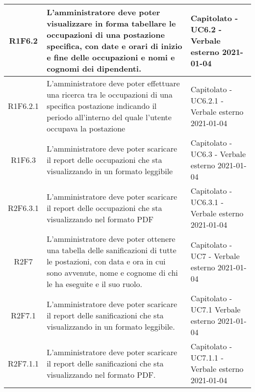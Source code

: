 \begin{center}
\begin{longtable}{|c|p{10cm}|p{4cm}|}
			\hline
			R1F6.2&L'amministratore deve poter visualizzare in forma tabellare le occupazioni di una postazione specifica, con date e orari di inizio e fine delle occupazioni e nomi e cognomi dei dipendenti.	&Capitolato - UC6.2 - Verbale esterno 2021-01-04	\\
			\hline
			R1F6.2.1&L'amministratore deve poter effettuare una ricerca tra le occupazioni di una specifica postazione indicando il periodo all'interno del quale l'utente occupava la postazione	& 	Capitolato - UC6.2.1 - Verbale esterno 2021-01-04\\
			\hline
			R1F6.3 & L'amministratore deve poter scaricare il report delle occupazioni che sta visualizzando in un formato leggibile & Capitolato - UC6.3 - Verbale esterno 2021-01-04\\
			\hline
			R2F6.3.1 & L'amministratore deve poter scaricare il report delle occupazioni che sta visualizzando nel formato PDF & Capitolato - UC6.3.1 - Verbale esterno 2021-01-04\\
			\hline
R2F7&L'amministratore deve poter ottenere una tabella delle sanificazioni di tutte le postazioni, con data e ora in cui sono avvenute, nome e cognome di chi le ha eseguite e il suo ruolo.	&Capitolato - UC7 - Verbale esterno 2021-01-04	\\
					
					\hline
R2F7.1&L'amministratore deve poter scaricare il report delle sanificazioni che sta visualizzando in un formato leggibile.	&Capitolato - UC7.1 Verbale esterno 2021-01-04	\\

\hline
R2F7.1.1&L'amministratore deve poter scaricare il report delle sanificazioni che sta visualizzando nel formato PDF.	&Capitolato - UC7.1.1 - Verbale esterno 2021-01-04	\\


\end{longtable}
\end{center}
